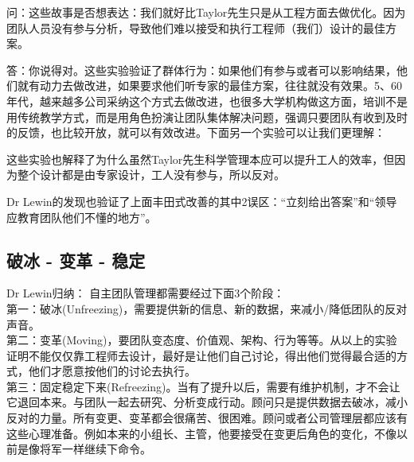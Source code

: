 问：这些故事是否想表达：我们就好比Taylor先生只是从工程方面去做优化。因为团队人员没有参与分析，导致他们难以接受和执行工程师（我们）设计的最佳方案。

答：你说得对。这些实验验证了群体行为：如果他们有参与或者可以影响结果，他们就有动力去做改进，如果要求他们听专家的最佳方案，往往就没有效果。5、60年代，越来越多公司采纳这个方式去做改进，也很多大学机构做这方面，培训不是用传统教学方式，而是用角色扮演让团队集体解决问题，强调只要团队有收到及时的反馈，也比较开放，就可以有效改进。下面另一个实验可以让我们更理解：


这些实验也解释了为什么虽然Taylor先生科学管理本应可以提升工人的效率，但因为整个设计都是由专家设计，工人没有参与，所以反对。

Dr Lewin的发现也验证了上面丰田式改善的其中2误区：“立刻给出答案”和“领导应教育团队他们不懂的地方”。

\hypertarget{ux7834ux51b0---ux53d8ux9769---ux7a33ux5b9a}{%
\subsection{破冰 - 变革 -
稳定}\label{ux7834ux51b0---ux53d8ux9769---ux7a33ux5b9a}}

Dr Lewin归纳： 自主团队管理都需要经过下面3个阶段：\\
第一：破冰(Unfreezing)，需要提供新的信息、新的数据，来减小/降低团队的反对声音。\\
第二：变革(Moving)，要团队变态度、价值观、架构、行为等等。从以上的实验证明不能仅仅靠工程师去设计，最好是让他们自己讨论，得出他们觉得最合适的方式，他们才愿意按他们的讨论去执行。\\
第三：固定稳定下来(Refreezing)。当有了提升以后，需要有维护机制，才不会让它退回本来。与团队一起去研究、分析变成行动。顾问只是提供数据去破冰，减小反对的力量。所有变更、变革都会很痛苦、很困难。顾问或者公司管理层都应该有这些心理准备。例如本来的小组长、主管，他要接受在变更后角色的变化，不像以前是像将军一样继续下命令。

